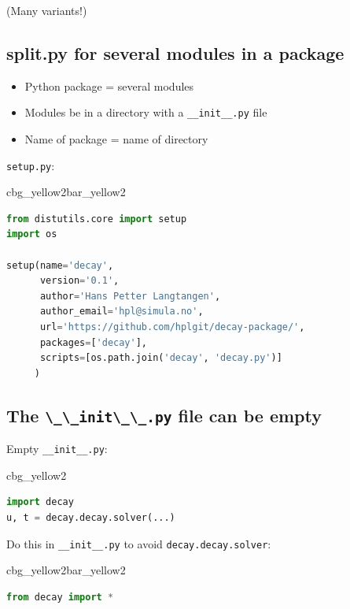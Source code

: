\documentclass[%
oneside,                 %
final,                   %
10pt]{article}
\newenvironment{_cod_tight}[1]{
   \def\FrameCommand{\colorbox{#1}}
   \FrameRule0.6pt\MakeFramed {\FrameRestore}\vskip3mm}
   {\vskip0mm\endMakeFramed}
\newenvironment{cod}[1]{
\bgroup\rmfamily
\fboxsep=0mm\relax
\begin{_cod_tight}{#1}
\list{}{\parsep=-2mm\parskip=0mm\topsep=0pt\leftmargin=2mm
\rightmargin=2\leftmargin\leftmargin=4pt\relax}
\item\relax}
{\endlist\end{_cod_tight}\egroup}
\newenvironment{_pro_tight}[2]{
   \def\FrameCommand{\color{#2}\vrule width 1mm\normalcolor\colorbox{#1}}
   \FrameRule0.6pt\MakeFramed {\advance\hsize-2mm\FrameRestore}\vskip3mm}
   {\vskip0mm\endMakeFramed}
\newenvironment{pro}[2]{
\bgroup\rmfamily
\fboxsep=0mm\relax
\begin{_pro_tight}{#1}{#2}
\list{}{\parsep=-2mm\parskip=0mm\topsep=0pt\leftmargin=2mm
\rightmargin=2\leftmargin\leftmargin=4pt\relax}
\item\relax}
{\endlist\end{_pro_tight}\egroup}
\begin{document}
(Many variants!)

\subsection*{split.py for several modules in a package}

\begin{itemize}
 \item Python package = several modules

 \item Modules be in a directory with a \Verb!__init__.py! file

 \item Name of package = name of directory
\end{itemize}

\noindent
\texttt{setup.py}:

\begin{pro}{cbg_yellow2}{bar_yellow2}\begin{lstlisting}[language=Python,style=simple,xleftmargin=2mm]
from distutils.core import setup
import os

setup(name='decay',
      version='0.1',
      author='Hans Petter Langtangen',
      author_email='hpl@simula.no',
      url='https://github.com/hplgit/decay-package/',
      packages=['decay'],
      scripts=[os.path.join('decay', 'decay.py')]
     )
\end{lstlisting}\end{pro}
\noindent

\subsection*{The \protect\Verb!\_\_init\_\_.py! file can be empty}

Empty \Verb!__init__.py!:

\begin{cod}{cbg_yellow2}\begin{lstlisting}[language=Python,style=simple,xleftmargin=2mm]
import decay
u, t = decay.decay.solver(...)
\end{lstlisting}\end{cod}
\noindent

Do this in \Verb!__init__.py! to avoid \texttt{decay.decay.solver}:

\begin{pro}{cbg_yellow2}{bar_yellow2}\begin{lstlisting}[language=Python,style=simple,xleftmargin=2mm]
from decay import *
\end{lstlisting}\end{pro}
\noindent
\end{document}
